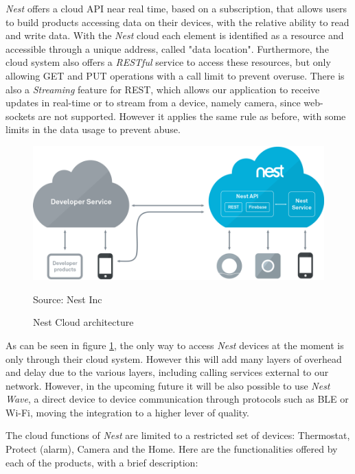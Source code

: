 \textit{Nest} offers a cloud API near real time, based on a subscription, that allows
users to build products accessing data on their devices, with the relative ability
to read and write data. With the \textit{Nest} cloud each element is identified as a resource
and accessible through a unique address, called "data location".
Furthermore, the cloud system also offers a \textit{RESTful} service to access these resources,
but only allowing GET and PUT operations with a call limit to prevent overuse. There is also
a \textit{Streaming} feature for REST, which allows our application to receive updates
in real-time or to stream from a device, namely camera, since web-sockets are not supported.
However it applies the same rule as before, with some limits in the data usage to prevent abuse.



\begin{figure}[h]
\caption{Nest Cloud architecture}
\label{fig:nestarch}
\centering
\includegraphics[scale=0.35]{nest-architecture.png}
\par{Source: Nest Inc}
\end{figure}

As can be seen in figure \ref{fig:nestarch}, the only way to access \textit{Nest} devices at the
moment is only through their cloud system. However this will add many layers of overhead
and delay due to the various layers, including calling services external to our network. However,
in the upcoming future it will be also possible to use \textit{Nest Wave}, a direct device
to device communication through protocols such as BLE or Wi-Fi, moving the integration to a higher
lever of quality.



The cloud functions of \textit{Nest} are limited to a restricted set of devices:
Thermostat, Protect (alarm), Camera and the Home.
Here are the functionalities offered by each of the products, with a brief description:
